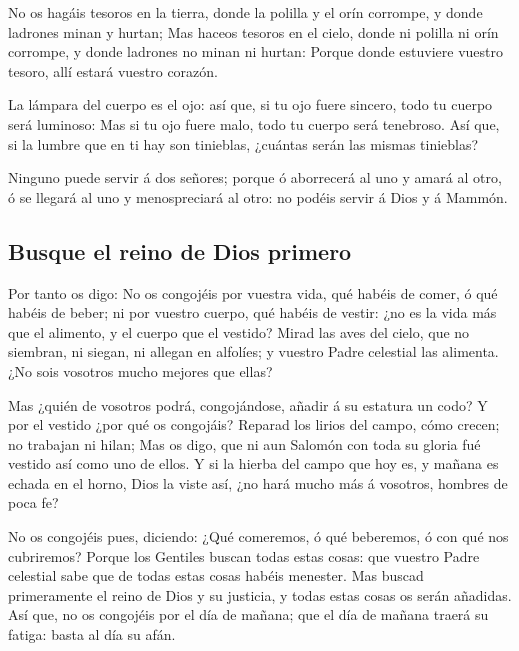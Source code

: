  No os hagáis tesoros en la tierra, donde la polilla y el
orín corrompe, y donde ladrones minan y hurtan;  Mas haceos
tesoros en el cielo, donde ni polilla ni orín corrompe, y donde ladrones
no minan ni hurtan:  Porque donde estuviere vuestro tesoro,
allí estará vuestro corazón.

 La lámpara del cuerpo es el ojo: así que, si tu ojo fuere
sincero, todo tu cuerpo será luminoso:  Mas si tu ojo fuere
malo, todo tu cuerpo será tenebroso. Así que, si la lumbre que en ti hay
son tinieblas, ¿cuántas serán las mismas tinieblas?

 Ninguno puede servir á dos señores; porque ó aborrecerá al
uno y amará al otro, ó se llegará al uno y menospreciará al otro: no
podéis servir á Dios y á Mammón.

\hypertarget{busque-el-reino-de-dios-primero}{%
\subsection{Busque el reino de Dios
primero}\label{busque-el-reino-de-dios-primero}}

 Por tanto os digo: No os congojéis por vuestra vida, qué
habéis de comer, ó qué habéis de beber; ni por vuestro cuerpo, qué
habéis de vestir: ¿no es la vida más que el alimento, y el cuerpo que el
vestido?  Mirad las aves del cielo, que no siembran, ni
siegan, ni allegan en alfolíes; y vuestro Padre celestial las alimenta.
¿No sois vosotros mucho mejores que ellas?

 Mas ¿quién de vosotros podrá, congojándose, añadir á su
estatura un codo?  Y por el vestido ¿por qué os congojáis?
Reparad los lirios del campo, cómo crecen; no trabajan ni hilan;
 Mas os digo, que ni aun Salomón con toda su gloria fué
vestido así como uno de ellos.  Y si la hierba del campo
que hoy es, y mañana es echada en el horno, Dios la viste así, ¿no hará
mucho más á vosotros, hombres de poca fe?

 No os congojéis pues, diciendo: ¿Qué comeremos, ó qué
beberemos, ó con qué nos cubriremos?  Porque los Gentiles
buscan todas estas cosas: que vuestro Padre celestial sabe que de todas
estas cosas habéis menester.  Mas buscad primeramente el
reino de Dios y su justicia, y todas estas cosas os serán añadidas.
 Así que, no os congojéis por el día de mañana; que el día
de mañana traerá su fatiga: basta al día su afán.

